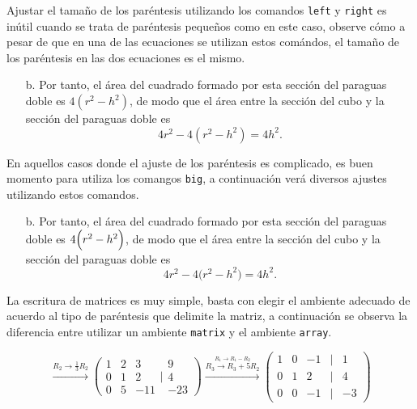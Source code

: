 \documentclass[10pt,a4paper]{article}
\newcommand{\comment}[1]{\textcolor{gray!75}{#1}}
\begin{document}
\comment{Ajustar el tamaño de los paréntesis utilizando los comandos \texttt{left} y \texttt{right} es inútil cuando se trata de paréntesis pequeños como en este caso, observe cómo a pesar de que en una de las ecuaciones se utilizan estos comándos, el tamaño de los paréntesis en las dos ecuaciones es el mismo.}

\begin{itemize}
	\item[b.] Por tanto, el área del cuadrado formado por esta sección del paraguas doble es $4(r^2 - h^2)$, de modo que el área entre la sección del cubo  y la sección del paraguas doble es 
	\[
		4r^2 - 4\left(r^2 - h^2\right) = 4h^2.
	\]
\end{itemize}

\comment{En aquellos casos donde el ajuste de los paréntesis es complicado, es buen momento para utiliza los comangos \texttt{big}, a continuación verá diversos ajustes utilizando estos comandos.}

\begin{itemize}
	\item[b.] Por tanto, el área del cuadrado formado por esta sección del paraguas doble es $4\Bigl(r^2 - h^2\Bigr)$, de modo que el área entre la sección del cubo  y la sección del paraguas doble es 
	\[
		4r^2 - 4\Biggl(r^2 - h^2\Biggr) = 4h^2.
	\]
\end{itemize}

\comment{La escritura de matrices es muy simple, basta con elegir el ambiente adecuado de acuerdo al tipo de paréntesis que delimite la matriz, a continuación se observa la diferencia entre utilizar un ambiente \texttt{matrix} y el ambiente \texttt{array}}.

\[
\xrightarrow{R_2 \to \frac{1}{3}R_2} \left(\begin{array}{ccc} 1 & 2 & 3 \\ 0 & 1 & 2 \\ 0 & 5 & -11\end{array} \Biggl| \begin{array}{c} 9 \\ 4 \\ -23\end{array}\right)\xrightarrow{\overset{R_1\to R_1 - R_2}{R_3\to R_3 + 5R_2}} \begin{pmatrix}1 & 0 & -1 & | & 1 \\ 0 & 1 & 2 & | & 4 \\ 0 & 0 & -1 & | & -3\end{pmatrix}
\]
\end{document}
